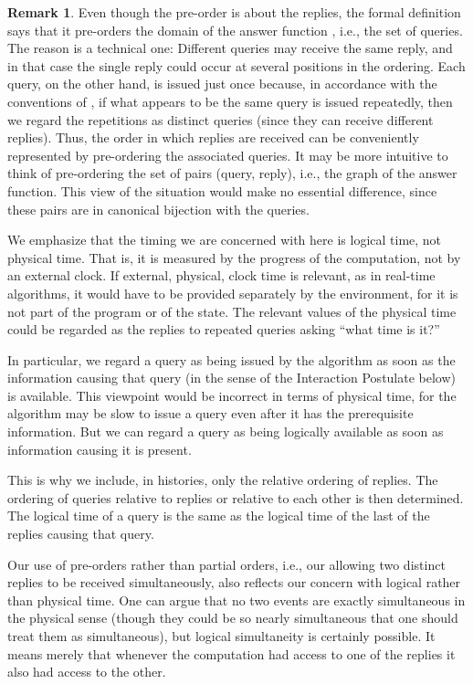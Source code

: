\documentclass{LMCS}
\theoremstyle{definition}
\newtheorem{rmk}[thm]{Remark}
\begin{document}
\begin{rmk}
  Even though the pre-order  is about the replies, the
  formal definition says that it pre-orders the domain of the answer
  function , i.e., the set of queries.  The reason is a
  technical one: Different queries may receive the same reply, and in
  that case the single reply could occur at several positions in the
  ordering.  Each query, on the other hand, is issued just once
  because, in accordance with the conventions of \cite{oa1}, if what
  appears to be the same query is issued repeatedly, then we regard
  the repetitions as distinct queries (since they can receive
  different replies).  Thus, the order in which replies are received
  can be conveniently represented by pre-ordering the associated
  queries.  It may be more intuitive to think of pre-ordering the set
  of pairs (query, reply), i.e., the graph of the answer
  function. This view of the situation would make no essential
  difference, since these pairs are in canonical bijection with the
  queries.
\end{rmk}

We emphasize that the timing we are concerned with here is logical
time, not physical time.  That is, it is measured by the progress of
the computation, not by an external clock.  If external, physical,
clock time is relevant, as in real-time algorithms, it would have to
be provided separately by the environment, for it is not part of the
program or of the state.  The relevant values of the physical time
could be regarded as the replies to repeated queries asking ``what
time is it?''

In particular, we regard a query as being issued by the algorithm as
soon as the information causing that query (in the sense of the
Interaction Postulate below) is available.  This viewpoint would be
incorrect in terms of physical time, for the algorithm may be slow to
issue a query even after it has the prerequisite information. But we
can regard a query as being logically available as soon as information
causing it is present.

This is why we include, in histories, only the relative ordering of
replies.  The ordering of queries relative to replies or relative to
each other is then determined.  The logical time of a query is the
same as the logical time of the last of the replies causing that
query.

Our use of pre-orders rather than partial orders, i.e., our allowing
two distinct replies to be received simultaneously, also reflects our
concern with logical rather than physical time.  One can argue that no
two events are exactly simultaneous in the physical sense (though they
could be so nearly simultaneous that one should treat them as
simultaneous), but logical simultaneity is certainly possible.  It
means merely that whenever the computation had access to one of the
replies it also had access to the other.
\end{document}
